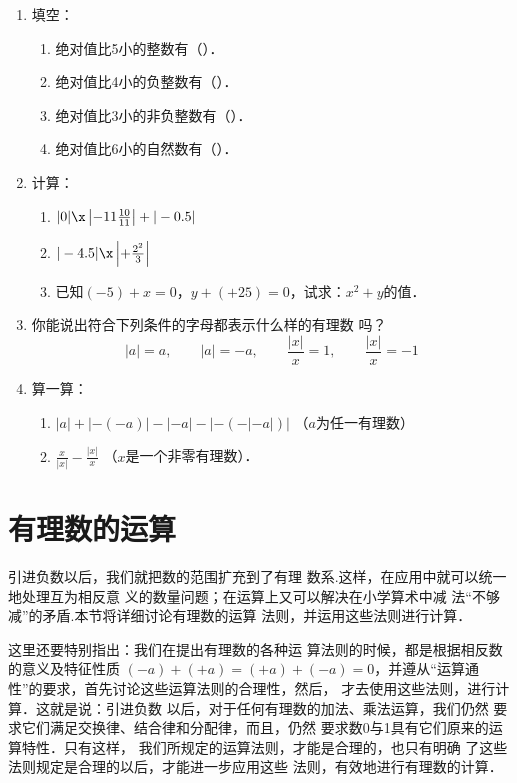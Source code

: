 \begin{enumerate}
	\item 填空：
	\begin{enumerate}
		\item 绝对值比5小的整数有（\qquad \qquad ）．
		\item 绝对值比4小的负整数有（\qquad \qquad ）．
		\item 绝对值比3小的非负整数有（\qquad \qquad ）．
		\item 绝对值比6小的自然数有（\qquad \qquad ）．
	\end{enumerate}
	
	
	\item 计算：
	\begin{enumerate}
		\item $|0|\x \left|-11\frac{10}{11}\right|+|-0.5|$
		\item $|-4.5|\x\left|+\frac{2^2}{3}\right|$
		\item 已知$(-5)+x=0$，$y+(+25)=0$，试求：$x^2+y$的值．
	\end{enumerate}
	
	\item 你能说出符合下列条件的字母都表示什么样的有理数
	吗？
	\[|a|=a,\qquad |a|=-a,\qquad \frac{|x|}{x}=1,\qquad \frac{|x|}{x}=-1  \]
	
	\item 算一算：
	\begin{enumerate}
		\item $|a|+|-(-a)|-|-a|-|-(-|-a|)|$ （$a$为任一有理数）
		\item $\frac{x}{|x|}-\frac{|x|}{x}$ （$x$是一个非零有理数）．
	\end{enumerate}
	
\end{enumerate}

\section{有理数的运算}
引进负数以后，我们就把数的范围扩充到了有理
数系.这样，在应用中就可以统一地处理互为相反意
义的数量问题；在运算上又可以解决在小学算术中减
法“不够减”的矛盾.本节将详细讨论有理数的运算
法则，并运用这些法则进行计算．

这里还要特别指出：我们在提出有理数的各种运
算法则的时候，都是根据相反数的意义及特征性质
$ (-a) + ( + a)=(+a)+(-a) = 0$，并遵从“运算通
性”的要求，首先讨论这些运算法则的合理性，然后，
才去使用这些法则，进行计算．这就是说：引进负数
以后，对于任何有理数的加法、乘法运算，我们仍然
要求它们满足交换律、结合律和分配律，而且，仍然
要求数0与1具有它们原来的运算特性．只有这样，
我们所规定的运算法则，才能是合理的，也只有明确
了这些法则规定是合理的以后，才能进一步应用这些
法则，有效地进行有理数的计算．

